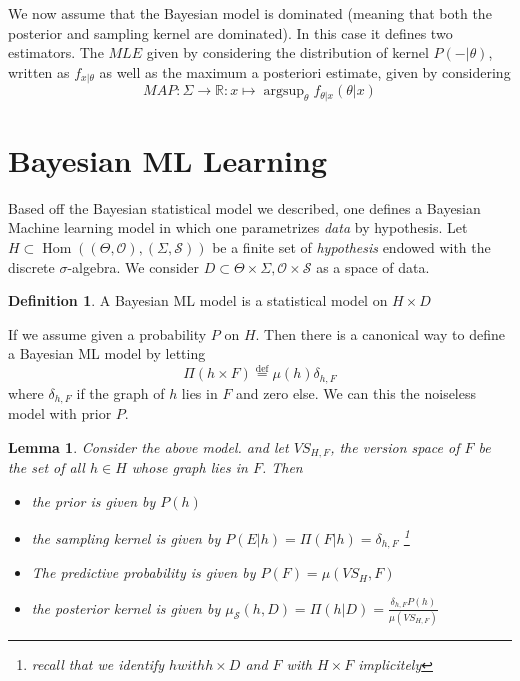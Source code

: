\documentclass{book}
\theoremstyle{plain}
\newtheorem{lemma}[corollary]{Lemma}
\theoremstyle{definition}
\newtheorem{definition}[corollary]{Definition}
\DeclareMathOperator{\argsup}{argsup}
\renewcommand{\d}[1]{\mathbb{#1}}
\newcommand{\define}{\stackrel{\operatorname{def}}{=}}
\newcommand{\fun}{\mapsto}
\DeclareMathOperator{\Hom}{Hom}
\newcommand{\mor}{\longrightarrow}
\renewcommand{\r}[1]{\mathcal{#1}}
\begin{document}
We now assume that the Bayesian model is dominated (meaning that both the posterior and sampling kernel are dominated). 
In this case it defines two estimators. The $MLE$ given by considering the distribution of kernel $P(- \vert \theta)$, written as $f_{x\vert \theta}$ as well as the maximum a posteriori estimate, given by considering
\[
MAP: \Sigma \mor \d{R}: x \fun \argsup_\theta f_{\theta \vert x}(\theta \vert x)
\] 
 
\section{Bayesian ML Learning} 
 
Based off the Bayesian statistical model we described, one defines a Bayesian Machine learning  model in which one parametrizes \emph{data} by hypothesis.
 Let $H\subset \Hom((\Theta,\r{O}),(\Sigma,\r{S}))$ be a finite set of \emph{hypothesis} endowed with the discrete $\sigma$-algebra. We consider  $D\subset \Theta\times \Sigma, \r{O}\times \r{S}$ as a space  of data.

\begin{definition}
A Bayesian ML model is a statistical model on $H\times D$	
\end{definition}


If we assume given a probability $P$ on $H$. Then there is a canonical way to define a Bayesian ML model by letting
\[
\Pi(h\times F)\define \mu(h)\delta_{h,F}
\]
where $\delta_{h,F}$ if the graph of $h$ lies in $F$ and zero else. We can this the noiseless model with prior $P$.

\begin{lemma}
Consider the above model. and let $VS_{H,F}$, the version space of $F$ be the set of all $h \in H$ whose graph lies in $F$. Then
\begin{itemize}
\item the prior is given by $P(h)$
\item the sampling kernel is given by $P(E\vert h)=\Pi(F\vert h)=\delta_{h,F}$
\footnote{recall that we identify $h with h\times D$ and $F$ with $H\times F$ implicitely}
\item The predictive probability is	given by $P(F)= \mu(VS_H,F)$

\item the posterior kernel is given by $\mu_\r{S}(h,D)=\Pi(h\vert D)=\frac{\delta_{h,F}P(h)}{\mu(VS_{H,F})}$
\end{itemize}
\end{lemma}
\end{document}
